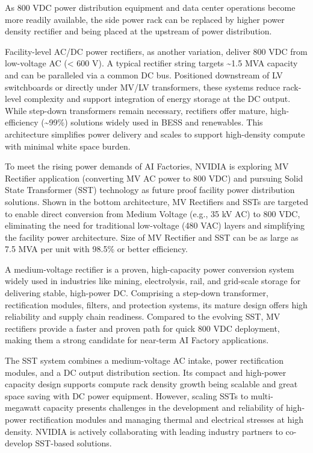 As 800 VDC power distribution equipment and data center operations become more readily available, the side power rack can be replaced by higher power density rectifier and being placed at the upstream of power distribution.

Facility-level AC/DC power rectifiers, as another variation, deliver 800 VDC from low-voltage AC (< 600 V). A typical rectifier string targets \textasciitilde{}1.5 MVA capacity and can be paralleled via a common DC bus. Positioned downstream of LV switchboards or directly under MV/LV transformers, these systems reduce rack-level complexity and support integration of energy storage at the DC output. While step-down transformers remain necessary, rectifiers offer mature, high-efficiency (\textasciitilde{}99\%) solutions widely used in BESS and renewables. This architecture simplifies power delivery and scales to support high-density compute with minimal white space burden.

To meet the rising power demands of AI Factories, NVIDIA is exploring MV Rectifier application (converting MV AC power to 800 VDC) and pursuing Solid State Transformer (SST) technology as future proof facility power distribution solutions. Shown in the bottom architecture, MV Rectifiers and SSTs are targeted to enable direct conversion from Medium Voltage (e.g., 35 kV AC) to 800 VDC, eliminating the need for traditional low-voltage (480 VAC) layers and simplifying the facility power architecture. Size of MV Rectifier and SST can be as large as 7.5 MVA per unit with 98.5\% or better efficiency.

A medium-voltage rectifier is a proven, high-capacity power conversion system widely used in industries like mining, electrolysis, rail, and grid-scale storage for delivering stable, high-power DC. Comprising a step-down transformer, rectification modules, filters, and protection systems, its mature design offers high reliability and supply chain readiness. Compared to the evolving SST, MV rectifiers provide a faster and proven path for quick 800 VDC deployment, making them a strong candidate for near-term AI Factory applications.

The SST system combines a medium-voltage AC intake, power rectification modules, and a DC output distribution section. Its compact and high-power capacity design supports compute rack density growth being scalable and great space saving with DC power equipment. However, scaling SSTs to multi-megawatt capacity presents challenges in the development and reliability of high-power rectification modules and managing thermal and electrical stresses at high density. NVIDIA is actively collaborating with leading industry partners to co-develop SST-based solutions.

